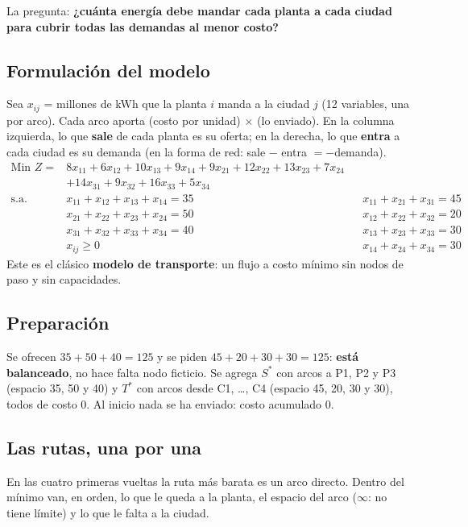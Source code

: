 \documentclass[11pt,a4paper]{article}
\newcommand{\Sini}{\ensuremath{S^{*}}}
\newcommand{\Tfin}{\ensuremath{T^{*}}}
\begin{document}
La pregunta: \textbf{¿cuánta energía debe mandar cada planta a cada ciudad para cubrir todas las demandas al menor costo?}

\subsection*{Formulación del modelo}
Sea $x_{ij}$ = millones de kWh que la planta $i$ manda a la ciudad $j$ (12 variables, una por arco). Cada arco aporta
(costo por unidad) $\times$ (lo enviado). En la columna izquierda, lo que \textbf{sale} de cada planta es su oferta; en la
derecha, lo que \textbf{entra} a cada ciudad es su demanda (en la forma de red: sale $-$ entra $= -$demanda).
\[
\begin{aligned}
\text{Min } Z = {}& 8x_{11} + 6x_{12} + 10x_{13} + 9x_{14} + 9x_{21} + 12x_{22} + 13x_{23} + 7x_{24}\\
                  & + 14x_{31} + 9x_{32} + 16x_{33} + 5x_{34}\\[3pt]
\text{s.a.}\quad & x_{11} + x_{12} + x_{13} + x_{14} = 35 && x_{11} + x_{21} + x_{31} = 45\\
& x_{21} + x_{22} + x_{23} + x_{24} = 50 && x_{12} + x_{22} + x_{32} = 20\\
& x_{31} + x_{32} + x_{33} + x_{34} = 40 && x_{13} + x_{23} + x_{33} = 30\\
& x_{ij} \ge 0 && x_{14} + x_{24} + x_{34} = 30
\end{aligned}
\]
Este es el clásico \textbf{modelo de transporte}: un flujo a costo mínimo sin nodos de paso y sin capacidades.

\subsection*{Preparación}
Se ofrecen $35 + 50 + 40 = 125$ y se piden $45 + 20 + 30 + 30 = 125$: \textbf{está balanceado}, no hace falta nodo
ficticio. Se agrega \Sini{} con arcos a P1, P2 y P3 (espacio 35, 50 y 40) y \Tfin{} con arcos desde C1, \dots, C4
(espacio 45, 20, 30 y 30), todos de costo 0. Al inicio nada se ha enviado: costo acumulado 0.

\subsection*{Las rutas, una por una}

En las cuatro primeras vueltas la ruta más barata es un arco directo. Dentro del mínimo van, en orden, lo que le
queda a la planta, el espacio del arco ($\infty$: no tiene límite) y lo que le falta a la ciudad.
\end{document}
